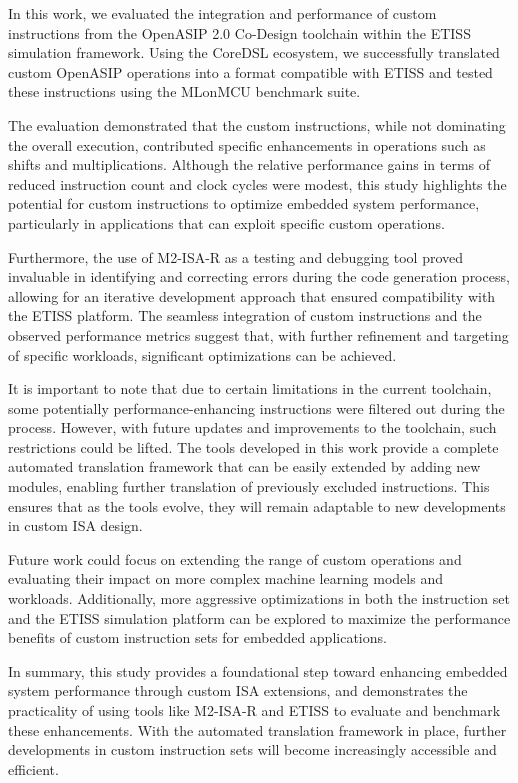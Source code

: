 In this work, we evaluated the integration and performance of custom instructions from the OpenASIP 2.0 Co-Design toolchain within the ETISS simulation framework. Using the CoreDSL ecosystem, we successfully translated custom OpenASIP operations into a format compatible with ETISS and tested these instructions using the MLonMCU benchmark suite.

The evaluation demonstrated that the custom instructions, while not dominating the overall execution, contributed specific enhancements in operations such as shifts and multiplications. Although the relative performance gains in terms of reduced instruction count and clock cycles were modest, this study highlights the potential for custom instructions to optimize embedded system performance, particularly in applications that can exploit specific custom operations.

Furthermore, the use of M2-ISA-R as a testing and debugging tool proved invaluable in identifying and correcting errors during the code generation process, allowing for an iterative development approach that ensured compatibility with the ETISS platform. The seamless integration of custom instructions and the observed performance metrics suggest that, with further refinement and targeting of specific workloads, significant optimizations can be achieved.

It is important to note that due to certain limitations in the current toolchain, some potentially performance-enhancing instructions were filtered out during the process. However, with future updates and improvements to the toolchain, such restrictions could be lifted. The tools developed in this work provide a complete automated translation framework that can be easily extended by adding new modules, enabling further translation of previously excluded instructions. This ensures that as the tools evolve, they will remain adaptable to new developments in custom ISA design.

Future work could focus on extending the range of custom operations and evaluating their impact on more complex machine learning models and workloads. Additionally, more aggressive optimizations in both the instruction set and the ETISS simulation platform can be explored to maximize the performance benefits of custom instruction sets for embedded applications.

In summary, this study provides a foundational step toward enhancing embedded system performance through custom ISA extensions, and demonstrates the practicality of using tools like M2-ISA-R and ETISS to evaluate and benchmark these enhancements. With the automated translation framework in place, further developments in custom instruction sets will become increasingly accessible and efficient.